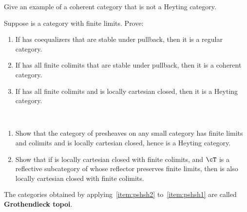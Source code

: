 \begin{ex}\label{ex:coherent-not-heyting}
  Give an example of a coherent category that is not a Heyting category.
\end{ex}

\begin{ex}\label{ex:lccc}
  Suppose \cS is a category with finite limits.
  Prove:
  \begin{enumerate}
  \item If \cS has coequalizers that are stable under pullback, then it is a regular category.
  \item If \cS has all finite colimits that are stable under pullback, then it is a coherent category.
  \item If \cS has all finite colimits and is locally cartesian closed, then it is a Heyting category.
  \end{enumerate}
\end{ex}

\begin{ex}\label{ex:presheaves-sheaves}\ 
  \begin{enumerate}
  \item Show that the category of presheaves on any small category has finite limits and colimits and is locally cartesian closed, hence is a Heyting category.\label{item:pshsh1}
  \item Show that if \cS is locally cartesian closed with finite colimits, and $\cT$ is a reflective subcategory of \cS whose reflector preserves finite limits, then \cT is also locally cartesian closed with finite colimits.\label{item:pshsh2}
  \end{enumerate}
  The categories obtained by applying~\ref{item:pshsh2} to~\ref{item:pshsh1} are called \textbf{Grothendieck topoi}.
\end{ex}


